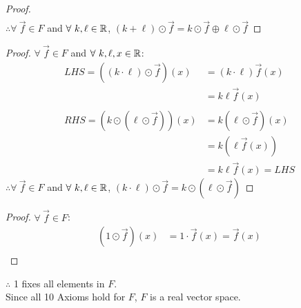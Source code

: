 \begin{enumerate}
\begin{proof}
\begin{align*}
    \end{align*}
    $\therefore \forall~\vec{f} \in F$ and $\forall~k, \ell \in \mathbb{R}$, $(k + \ell) \odot \vec{f} = k \odot \vec{f} \oplus \ell \odot \vec{f}$
  \end{proof}
  \begin{proof}
    $\forall~\vec{f} \in F$ and $\forall~k, \ell, x \in \mathbb{R}$:
    \begin{align*}
      LHS = ((k \cdot \ell) \odot \vec{f})(x) & = (k \cdot \ell)\vec{f}(x) \\
                                              & = k\ell\vec{f}(x)          \\ \\
      RHS = (k \odot (\ell \odot \vec{f}))(x) & = k(\ell \odot \vec{f})(x) \\
                                              & = k(\ell\vec{f}(x))        \\
                                              & = k\ell\vec{f}(x) = LHS
    \end{align*}
    $\therefore \forall~\vec{f} \in F$ and $\forall~k, \ell \in \mathbb{R}$, $(k \cdot \ell) \odot \vec{f} = k \odot (\ell \odot \vec{f})$
  \end{proof}
  \begin{proof}
    $\forall~\vec{f} \in F$:
    \begin{align*}
      (1 \odot \vec{f})(x) & = 1\cdot\vec{f}(x) = \vec{f}(x) \\
    \end{align*}
  \end{proof}
  $\therefore$ 1 fixes all elements in $F$. \\
  Since all 10 Axioms hold for $F$, $F$ is a real vector space.
\end{enumerate}

